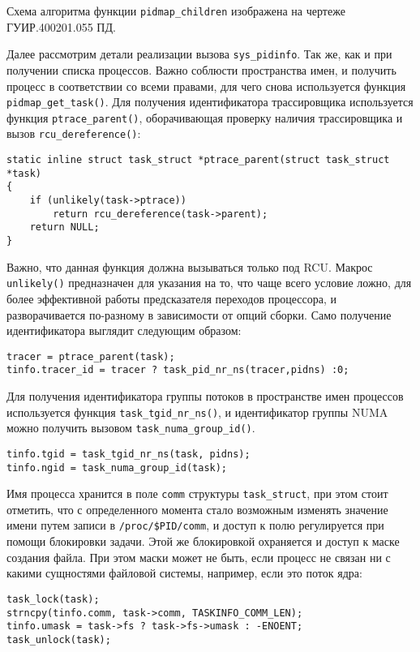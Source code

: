 Схема алгоритма функции \texttt{pidmap\_children} изображена на чертеже
ГУИР.400201.055 ПД.

Далее рассмотрим детали реализации вызова \texttt{sys\_pidinfo}. Так же, как и
при получении списка процессов. Важно соблюсти пространства имен, и получить
процесс в соответствии со всеми правами, для чего снова используется функция
\texttt{pidmap\_get\_task()}. Для получения идентификатора
трассировщика  используется функция \texttt{ptrace\_parent()}, оборачивающая
проверку наличия трассировщика и вызов
\texttt{rcu\_dereference()}:
\medskip
\begin{lstlisting}[style=cstyle]
static inline struct task_struct *ptrace_parent(struct task_struct *task)
{
	if (unlikely(task->ptrace))
		return rcu_dereference(task->parent);
	return NULL;
}
\end{lstlisting}
\medskip

Важно, что данная функция должна вызываться только под RCU. Макрос
\texttt{unlikely()} предназначен для указания на то, что чаще всего условие
ложно, для более эффективной работы предсказателя переходов процессора, и
разворачивается по-разному в зависимости от опций сборки. Само получение
идентификатора выглядит следующим образом:
\medskip
\begin{lstlisting}[style=cstyle]
tracer = ptrace_parent(task);
tinfo.tracer_id = tracer ? task_pid_nr_ns(tracer,pidns) :0;
\end{lstlisting}
\medskip

Для получения идентификатора группы потоков в пространстве имен процессов
используется функция \texttt{task\_tgid\_nr\_ns()}, и идентификатор группы NUMA
можно получить вызовом \texttt{task\_numa\_group\_id()}.
\medskip
\begin{lstlisting}[style=cstyle]
tinfo.tgid = task_tgid_nr_ns(task, pidns);
tinfo.ngid = task_numa_group_id(task);
\end{lstlisting}
\medskip

Имя процесса хранится в поле \texttt{comm} структуры \texttt{task\_struct}, при
этом стоит отметить, что с определенного момента стало возможным изменять
значение имени путем записи в \texttt{/proc/\$PID/comm}, и доступ к полю
регулируется при помощи блокировки задачи. Этой же блокировкой охраняется и
доступ к маске создания файла. При этом маски может не быть, если процесс не
связан ни с какими сущностями файловой системы, например, если это поток ядра:
\medskip
\begin{lstlisting}[style=cstyle]
task_lock(task);
strncpy(tinfo.comm, task->comm, TASKINFO_COMM_LEN);
tinfo.umask = task->fs ? task->fs->umask : -ENOENT;
task_unlock(task);
\end{lstlisting}
\medskip

